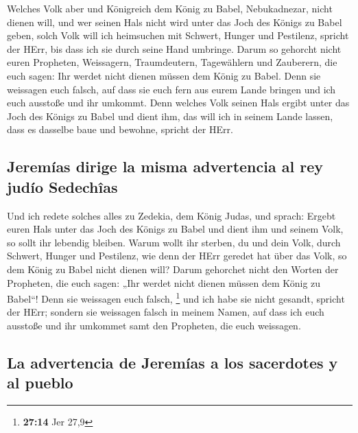  Welches Volk aber und Königreich dem König zu Babel,
Nebukadnezar, nicht dienen will, und wer seinen Hals nicht wird unter
das Joch des Königs zu Babel geben, solch Volk will ich heimsuchen mit
Schwert, Hunger und Pestilenz, spricht der HErr, bis dass ich sie durch
seine Hand umbringe.  Darum so gehorcht nicht euren
Propheten, Weissagern, Traumdeutern, Tagewählern und Zauberern, die euch
sagen: Ihr werdet nicht dienen müssen dem König zu Babel.
 Denn sie weissagen euch falsch, auf dass sie euch fern
aus eurem Lande bringen und ich euch ausstoße und ihr umkommt.
 Denn welches Volk seinen Hals ergibt unter das Joch des
Königs zu Babel und dient ihm, das will ich in seinem Lande lassen, dass
es dasselbe baue und bewohne, spricht der HErr.

\hypertarget{jeremuxedas-dirige-la-misma-advertencia-al-rey-juduxedo-sedechuxeeas}{%
\subsection{Jeremías dirige la misma advertencia al rey judío
Sedechîas}\label{jeremuxedas-dirige-la-misma-advertencia-al-rey-juduxedo-sedechuxeeas}}

 Und ich redete solches alles zu Zedekia, dem König
Judas, und sprach: Ergebt euren Hals unter das Joch des Königs zu Babel
und dient ihm und seinem Volk, so sollt ihr lebendig bleiben.
 Warum wollt ihr sterben, du und dein Volk, durch
Schwert, Hunger und Pestilenz, wie denn der HErr geredet hat über das
Volk, so dem König zu Babel nicht dienen will?  Darum
gehorchet nicht den Worten der Propheten, die euch sagen: „Ihr werdet
nicht dienen müssen dem König zu Babel``! Denn sie weissagen euch
falsch, \footnote{\textbf{27:14} Jer 27,9}  und ich habe
sie nicht gesandt, spricht der HErr; sondern sie weissagen falsch in
meinem Namen, auf dass ich euch ausstoße und ihr umkommet samt den
Propheten, die euch weissagen.

\hypertarget{la-advertencia-de-jeremuxedas-a-los-sacerdotes-y-al-pueblo}{%
\subsection{La advertencia de Jeremías a los sacerdotes y al
pueblo}\label{la-advertencia-de-jeremuxedas-a-los-sacerdotes-y-al-pueblo}}

